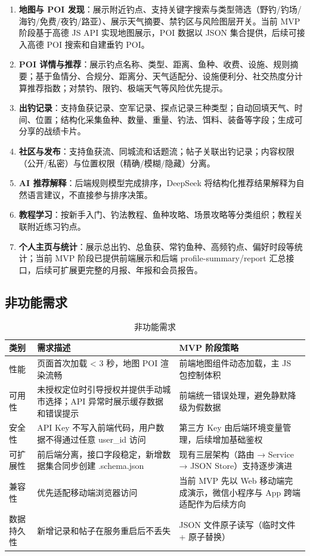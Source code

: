 \begin{enumerate}
  \item \textbf{地图与 POI 发现}：展示附近钓点、支持关键字搜索与类型筛选（野钓/钓场/海钓/免费/夜钓/路亚）、展示天气摘要、禁钓区与风险图层开关。当前 MVP 阶段基于高德 JS API 实现地图展示，POI 数据以 JSON 集合提供，后续可接入高德 POI 搜索和自建垂钓 POI。
  \item \textbf{POI 详情与推荐}：展示钓点名称、类型、距离、鱼种、收费、设施、规则摘要；基于鱼情分、合规分、距离分、天气适配分、设施便利分、社交热度分计算推荐指数；对禁钓、限钓、极端天气等风险优先提示。
  \item \textbf{出钓记录}：支持鱼获记录、空军记录、探点记录三种类型；自动回填天气、时间、位置；结构化采集鱼种、数量、重量、钓法、饵料、装备等字段；生成可分享的战绩卡片。
  \item \textbf{社区与发布}：支持鱼获流、同城流和话题流；帖子关联出钓记录；内容权限（公开/私密）与位置权限（精确/模糊/隐藏）分离。
  \item \textbf{AI 推荐解释}：后端规则模型完成排序，DeepSeek 将结构化推荐结果解释为自然语言建议，不直接参与排序决策。
  \item \textbf{教程学习}：按新手入门、钓法教程、鱼种攻略、场景攻略等分类组织；教程关联附近练习钓点。
  \item \textbf{个人主页与统计}：展示总出钓、总鱼获、常钓鱼种、高频钓点、偏好时段等统计；当前 MVP 阶段已提供前端展示和后端 profile-summary/report 汇总接口，后续可扩展更完整的月报、年报和会员报告。
\end{enumerate}

\subsection{非功能需求}

\begin{table}[H]
  \centering
  \caption{非功能需求}
  \label{tab:nfr}
  \begin{tabularx}{\textwidth}{p{3cm}|p{6cm}|p{6cm}}
    \toprule
    \textbf{类别} & \textbf{需求描述} & \textbf{MVP 阶段策略} \\
    \midrule
    性能 & 页面首次加载 < 3 秒，地图 POI 渲染流畅 & 前端地图组件动态加载，主 JS 包控制体积 \\
    \hline
    可用性 & 未授权定位时引导授权并提供手动城市选择；API 异常时展示缓存数据和错误提示 & 前端统一错误处理，避免静默降级为假数据 \\
    \hline
    安全性 & API Key 不写入前端代码，用户数据不得通过任意 user\_id 访问 & 第三方 Key 由后端环境变量管理，后续增加基础鉴权 \\
    \hline
    可扩展性 & 前后端分离，接口字段稳定，新增数据集合同步创建 .schema.json & 现有三层架构（路由 → Service → JSON Store）支持逐步演进 \\
    \hline
    兼容性 & 优先适配移动端浏览器访问 & 当前 MVP 先以 Web 移动端完成演示，微信小程序与 App 跨端适配作为后续方向 \\
    \hline
    数据持久性 & 新增记录和帖子在服务重启后不丢失 & JSON 文件原子读写（临时文件 + 原子替换） \\
    \bottomrule
  \end{tabularx}
\end{table}

